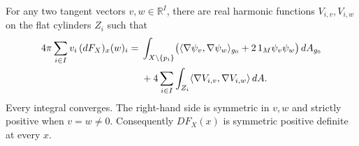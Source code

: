 \begin{theorem}
\label{C:A2b-energy}
For any two tangent vectors $v,w\in\mathbb R^I$, there are real harmonic functions $V_{i,v},V_{i,w}$ on the flat cylinders $Z_i$ such that
\begin{align}
4\pi\sum_{i\in I}v_i\,(dF_X)_x(w)_i
={}&\int_{X\setminus\{p_i\}}
 \bigl(\langle\nabla\psi_v,\nabla\psi_w\rangle_{g_0}
       +2\,1_M\psi_v\psi_w\bigr)\,dA_{g_0}\notag\\
 &+4\sum_{i\in I}\int_{Z_i}
       \langle\nabla V_{i,v},\nabla V_{i,w}\rangle\,dA.
\label{C:eq-radius-energy}
\end{align}
Every integral converges. The right-hand side is symmetric in $v,w$ and strictly positive when $v=w\ne0$. Consequently $DF_X(x)$ is symmetric positive definite at every $x$.
\end{theorem}
